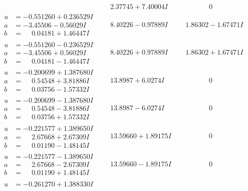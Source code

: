 \documentclass[1p]{elsarticle_modified}
\theoremstyle{definition}
\begin{document}
$$\begin{array}{c|c|c}
 & \phantom{-}2.37745 + 7.40004 I & \phantom{-0.000000 } 0 \\ \hline\begin{aligned}
u &= -0.551260 + 0.236529 I \\
a &= -3.45506 - 0.56029 I \\
b &= \phantom{-}0.04181 + 1.46447 I\end{aligned}
 & \phantom{-}8.40226 - 0.97889 I & \phantom{-}1.86302 - 1.67471 I \\ \hline\begin{aligned}
u &= -0.551260 - 0.236529 I \\
a &= -3.45506 + 0.56029 I \\
b &= \phantom{-}0.04181 - 1.46447 I\end{aligned}
 & \phantom{-}8.40226 + 0.97889 I & \phantom{-}1.86302 + 1.67471 I \\ \hline\begin{aligned}
u &= -0.200699 + 1.387680 I \\
a &= \phantom{-}0.54548 + 3.81886 I \\
b &= \phantom{-}0.03756 - 1.57332 I\end{aligned}
 & \phantom{-}13.8987 + 6.0274 I & \phantom{-0.000000 } 0 \\ \hline\begin{aligned}
u &= -0.200699 - 1.387680 I \\
a &= \phantom{-}0.54548 - 3.81886 I \\
b &= \phantom{-}0.03756 + 1.57332 I\end{aligned}
 & \phantom{-}13.8987 - 6.0274 I & \phantom{-0.000000 } 0 \\ \hline\begin{aligned}
u &= -0.221577 + 1.389650 I \\
a &= \phantom{-}2.67668 + 2.67309 I \\
b &= \phantom{-}0.01190 - 1.48145 I\end{aligned}
 & \phantom{-}13.59660 + 1.89175 I & \phantom{-0.000000 } 0 \\ \hline\begin{aligned}
u &= -0.221577 - 1.389650 I \\
a &= \phantom{-}2.67668 - 2.67309 I \\
b &= \phantom{-}0.01190 + 1.48145 I\end{aligned}
 & \phantom{-}13.59660 - 1.89175 I & \phantom{-0.000000 } 0 \\ \hline\begin{aligned}
u &= -0.261270 + 1.388330 I \\

\end{aligned}
\end{array}$$
\end{document}
